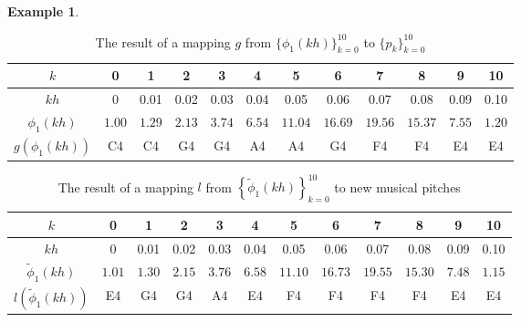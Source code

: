 \documentclass[11pt]{article}
\theoremstyle{definition}
\newtheorem{example}[theorem]{Example}
\begin{document}
\begin{example}
\begin{table}
\centering
\caption{The result of a mapping $g$ from $\{ \phi_1(kh) \}_{k=0}^{10}$ to $\{p_k\}_{k=0}^{10}$}
\begin{tabular}{|c||c|c|c|c|c|c|c|c|c|c|c|}
\hline
$k$ & 0 & 1 & 2 & 3 & 4 & 5 & 6 & 7 & 8 & 9 & 10 \\
\hline
$kh$ & 0 & 0.01 & 0.02 & 0.03 & 0.04 & 0.05 & 0.06 & 0.07 & 0.08 & 0.09 & 0.10 \\
\hline
$\phi_1(kh)$ & $1.00$ & $1.29$ & $2.13$ & $3.74$ & $6.54$ & $11.04$ & $16.69$ & $19.56$ & $15.37$ & $7.55$ & $1.20$ \\
\hline
$g(\phi_1(kh))$ & C4 & C4 & G4 & G4 & A4 & A4 & G4 & F4 & F4 & E4 & E4  \\
\hline
\end{tabular}
\label{table: gmap}
\end{table}

\begin{table}
\centering
\caption{The result of a mapping $l$ from $\left\{\tilde{\phi}_1(kh) \right\}_{k=0}^{10}$ to new musical pitches}
\begin{tabular}{|c||c|c|c|c|c|c|c|c|c|c|c|}
\hline
$k$ & 0 & 1 & 2 & 3 & 4 & 5 & 6 & 7 & 8 & 9 & 10 \\
\hline
$kh$ & 0 & 0.01 & 0.02 & 0.03 & 0.04 & 0.05 & 0.06 & 0.07 & 0.08 & 0.09 & 0.10 \\
\hline
$\tilde{\phi}_1(kh)$ & $1.01$ & $1.30$ & $2.15$ & $3.76$ & $6.58$ & $11.10$ & $16.73$ & $19.55$ & $15.30$ & $7.48$ & $1.15$ \\
\hline
$l(\tilde{\phi}_1(kh))$ & E4 & G4 & G4 & A4 & E4 & F4 & F4 & F4 & F4 & E4 & E4  \\
\hline
\end{tabular}
\label{table: lmap}
\end{table}

\end{example}
\end{document}
